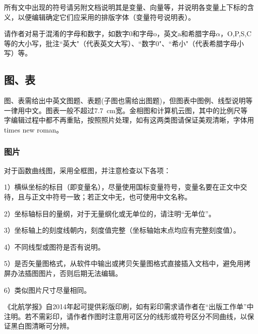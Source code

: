 \documentclass[10.5pt,twocolumn]{aaas}
\begin{document}
所有文中出现的符号请另附文档说明其是变量、向量等，并说明各变量上下标的含义，以便编辑确定它们应采用的排版字体（变量符号说明表）。

请作者对易于混淆的字母和数字，如数字0和字母o，英文a和希腊字母$\alpha$，O,P,S,C等的大小写，批注``英大"（代表英文大写）、``数字0"、``希小"（代表希腊字母小写）等。

\subsection{图、表}
图、表需给出中英文图题、表题(子图也需给出图题)，但图表中图例、线型说明等一律用中文。图表一般不超过7.7\ cm宽。金相图和计算机云图，其中的比例尺等字编辑过程中都不再重贴，按照照片处理，如有这两类图请保证美观清晰，字体用times new roman。

\subsubsection{图片}
对于函数曲线图，采用全框图，并注意检查以下各项：

1）横纵坐标的标目（即变量名），尽量使用国标变量符号，变量名要在正文中交待，且与正文中符号一致；若正文中无，也可使用中文名称。

2）坐标轴标目的量纲，对于无量纲化或无单位的，请注明``无单位”。

3）坐标轴上的刻度线朝内，刻度值完整（坐标轴始末点均应有完整刻度值）。

4）不同线型或图符是否有说明。

5）是否矢量图格式，从软件中输出或拷贝矢量图格式直接插入文档中，避免用拷屏办法插图图片，否则后期无法编辑。

6）类似图片尺寸尽量相同。

《北航学报》自2014年起可提供彩版印刷，如有彩印需求请作者在“出版工作单”中注明。若不需彩印，请作者作图时注意用可区分的线形或符号区分不同曲线，以保证黑白图清晰可分辨。 
\end{document}
